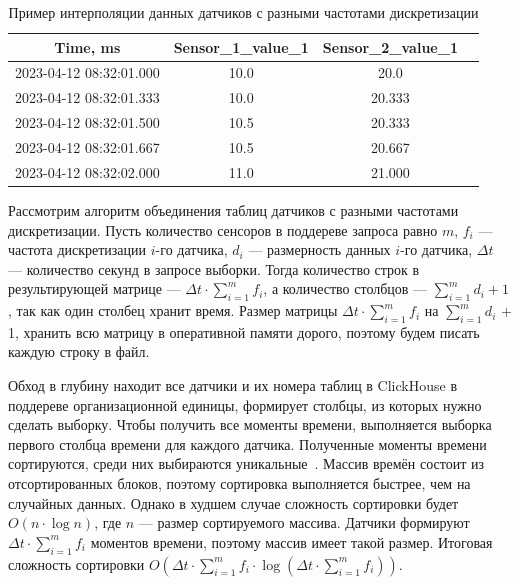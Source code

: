 \begin{table}
  \caption{Пример интерполяции данных датчиков с разными частотами дискретизации}
  \fontsize{12pt}{18pt}\selectfont
  \begin{tabular}{|c|c|c|c|}\hline
    \textbf{Time, ms}       & \textbf{Sensor\_1\_value\_1} & \textbf{Sensor\_2\_value\_1} \\ \hline
    2023-04-12 08:32:01.000 & 10.0                         & 20.0                         \\ \hline
    2023-04-12 08:32:01.333 & 10.0                         & 20.333                       \\ \hline
    2023-04-12 08:32:01.500 & 10.5                         & 20.333                       \\ \hline
    2023-04-12 08:32:01.667 & 10.5                         & 20.667                       \\ \hline
    2023-04-12 08:32:02.000 & 11.0                         & 21.000                       \\ \hline
  \end{tabular}
  \label{sample2}
\end{table}

Рассмотрим алгоритм объединения таблиц датчиков с разными частотами дискретизации. Пусть количество сенсоров в поддереве запроса равно $m$, $f_i$ --- частота дискретизации $i$-го датчика, $d_i$ --- размерность данных $i$-го датчика, ${\Delta}t$ --- количество секунд в запросе выборки. Тогда количество строк в результирующей матрице --- ${\Delta}t \cdot \sum^{m}_{i=1}{f_i}$, а количество столбцов --- $\sum^{m}_{i=1}{d_i} + 1$, так как один столбец хранит время. Размер матрицы ${\Delta}t \cdot \sum^{m}_{i=1}{f_i} $ на $\sum^{m}_{i=1}{d_i}$ + 1, хранить всю матрицу в оперативной памяти дорого, поэтому будем писать каждую строку в файл.

Обход в глубину находит все датчики и их номера таблиц в ClickHouse в поддереве организационной единицы, формирует столбцы, из которых нужно сделать выборку. Чтобы получить все моменты времени, выполняется выборка первого столбца времени для каждого датчика. Полученные моменты времени сортируются, среди них выбираются уникальные~\cite{np-unique}. Массив времён состоит из отсортированных блоков, поэтому сортировка выполняется быстрее, чем на случайных данных. Однако в худшем случае сложность сортировки будет $O(n \cdot \log{n})$, где $n$ --- размер сортируемого массива. Датчики формируют ${\Delta}t \cdot \sum^{m}_{i=1}{f_i}$ моментов времени, поэтому массив имеет такой размер. Итоговая сложность сортировки $O({\Delta}t \cdot \sum^{m}_{i=1}{f_i} \cdot \log{({\Delta}t \cdot \sum^{m}_{i=1}{f_i})})$.

